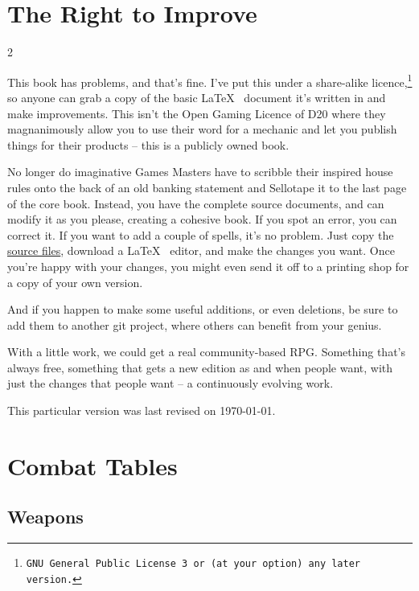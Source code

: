 \section{The Right to Improve}

\begin{multicols}{2}

\noindent
This book has problems, and that's fine.
I've put this under a share-alike licence,\footnote{\tt GNU General Public License 3 or (at your option) any later version.} so anyone can grab a copy of the basic \LaTeX~ document it's written in and make improvements.
This isn't the Open Gaming Licence of D20 where they magnanimously allow you to use their word for a mechanic and let you publish things for their products -- this is a publicly owned book.

No longer do imaginative Games Masters have to scribble their inspired house rules onto the back of an old banking statement and Sellotape it to the last page of the core book.
Instead, you have the complete source documents, and can modify it as you please, creating a cohesive book.
If you spot an error, you can correct it.
If you want to add a couple of spells, it's no problem.
Just copy the \href{https://gitlab.com/bindrpg/core}{source files}, download a \LaTeX~ editor, and make the changes you want.
Once you're happy with your changes, you might even send it off to a printing shop for a copy of your own version.

And if you happen to make some useful additions, or even deletions, be sure to add them to another git project, where others can benefit from your genius.

With a little work, we could get a real community-based RPG.
Something that's always free, something that gets a new edition as and when people want, with just the changes that people want -- a continuously evolving work.

This particular version was last revised on \today.

\end{multicols}


\pagebreak
\section{Combat Tables}
\label{combatAppendix}

\subsection{Weapons}

